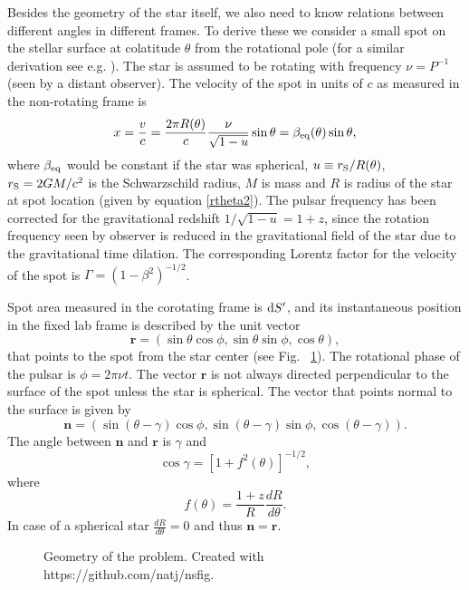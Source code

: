 \documentclass{wihuri}
\def\rg{r_{\rm S}} %
\def\be{\begin{equation}}
\def\ee{\end{equation}}
\def\d{{\rm d}}
\def\rg{r_{\rm S}} %
\newcommand{\bmath}[1]{\boldsymbol{#1}}
\begin{document}
Besides the geometry of the star itself, we also need to know relations between different angles in different frames. To derive these we consider a small spot on the stellar surface at colatitude $\theta$ from the rotational pole (for a similar derivation see e.g. \cite{poutabelo}). 
The star is assumed to be rotating  with frequency $\nu=P^{-1}$ (seen by a distant observer).
The velocity of the spot in units of $c$ as measured in the non-rotating frame is 
\begin{equation}
\label{beta2}
x = \frac{v}{c}=\frac{2\pi R(\theta)}{c} \frac{\nu}{\sqrt{1-u}} \sin\theta =\beta_{\rm eq}(\theta) \sin\theta,
\end{equation}
where $\beta_{\rm eq}$ would be constant if the star was spherical, $u\equiv\rg/R(\theta)$, 
$\rg=2GM/c^2$ is the Schwarzschild radius, $M$ is mass and $R$ is
radius of the star at spot location (given by equation \ref{rtheta2}). The pulsar frequency has been corrected for the gravitational redshift $1/\sqrt{1-u}=1+z$, since the rotation frequency seen by observer is reduced in the gravitational field of the star due to the gravitational time dilation. The corresponding Lorentz factor for the velocity of the spot is $\Gamma=(1-\beta^2)^{-1/2}$.



Spot area measured in the corotating frame is $\d S^\prime$, and its instantaneous position in
the fixed lab frame is described by the unit vector 
\begin{equation}
\bmath{r}=(\sin\theta\cos\phi, \sin\theta\sin\phi, \cos\theta),
\end{equation}
that points to the spot from the star center (see Fig. ~\ref{fig:geom2}). The rotational phase of the pulsar is $\phi=2\pi\nu t$. The vector $\bmath{r}$ is not always directed perpendicular to the surface of the spot unless the star is spherical. The vector that points normal to the surface is given by
\begin{equation}
\bmath{n}=(\sin(\theta-\gamma)\cos\phi, \sin(\theta-\gamma)\sin\phi, \cos(\theta-\gamma)).
\end{equation}
The angle between $\bmath{n}$ and $\bmath{r}$ is $\gamma$ and 
\begin{equation}
\cos\gamma=[1+f^{2}(\theta)]^{-1/2},
\end{equation}
where
\be \label{eq:ftheta}
f(\theta)=\frac{1+z}{R}\frac{dR}{d\theta}.
\ee
In case of a spherical star $\frac{dR}{d\theta} = 0$ and thus $\bmath{n} = \bmath{r}$.

\begin{figure}
\centerline{}
\caption{Geometry of the problem. Created with https://github.com/natj/nsfig. %
\label{fig:geom2}}
\end{figure}
\end{document}
